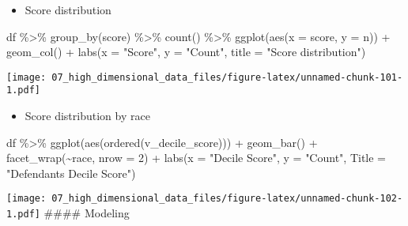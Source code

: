 \documentclass[
]{book}
\newenvironment{Shaded}{\begin{snugshade}}{\end{snugshade}}
\newcommand{\AttributeTok}[1]{\textcolor[rgb]{0.77,0.63,0.00}{#1}}
\newcommand{\DecValTok}[1]{\textcolor[rgb]{0.00,0.00,0.81}{#1}}
\newcommand{\FunctionTok}[1]{\textcolor[rgb]{0.00,0.00,0.00}{#1}}
\newcommand{\NormalTok}[1]{#1}
\newcommand{\SpecialCharTok}[1]{\textcolor[rgb]{0.00,0.00,0.00}{#1}}
\newcommand{\StringTok}[1]{\textcolor[rgb]{0.31,0.60,0.02}{#1}}
\providecommand{\tightlist}{%
  \setlength{\itemsep}{0pt}\setlength{\parskip}{0pt}}
\begin{document}
\begin{itemize}
\tightlist
\item
  Score distribution
\end{itemize}

\begin{Shaded}
\begin{Highlighting}[]
\NormalTok{df }\SpecialCharTok{\%\textgreater{}\%}
  \FunctionTok{group\_by}\NormalTok{(score) }\SpecialCharTok{\%\textgreater{}\%}
  \FunctionTok{count}\NormalTok{() }\SpecialCharTok{\%\textgreater{}\%}
  \FunctionTok{ggplot}\NormalTok{(}\FunctionTok{aes}\NormalTok{(}\AttributeTok{x =}\NormalTok{ score, }\AttributeTok{y =}\NormalTok{ n)) }\SpecialCharTok{+}
    \FunctionTok{geom\_col}\NormalTok{() }\SpecialCharTok{+}
    \FunctionTok{labs}\NormalTok{(}\AttributeTok{x =} \StringTok{"Score"}\NormalTok{,}
         \AttributeTok{y =} \StringTok{"Count"}\NormalTok{,}
         \AttributeTok{title =} \StringTok{"Score distribution"}\NormalTok{)}
\end{Highlighting}
\end{Shaded}

\texttt{[image: 07\_high\_dimensional\_data\_files/figure-latex/unnamed-chunk-101-1.pdf]}

\begin{itemize}
\tightlist
\item
  Score distribution by race
\end{itemize}

\begin{Shaded}
\begin{Highlighting}[]
\NormalTok{df }\SpecialCharTok{\%\textgreater{}\%}
  \FunctionTok{ggplot}\NormalTok{(}\FunctionTok{aes}\NormalTok{(}\FunctionTok{ordered}\NormalTok{(v\_decile\_score))) }\SpecialCharTok{+} 
          \FunctionTok{geom\_bar}\NormalTok{() }\SpecialCharTok{+}
          \FunctionTok{facet\_wrap}\NormalTok{(}\SpecialCharTok{\textasciitilde{}}\NormalTok{race, }\AttributeTok{nrow =} \DecValTok{2}\NormalTok{) }\SpecialCharTok{+}
          \FunctionTok{labs}\NormalTok{(}\AttributeTok{x =} \StringTok{"Decile Score"}\NormalTok{,}
               \AttributeTok{y =} \StringTok{"Count"}\NormalTok{,}
               \AttributeTok{Title =} \StringTok{"Defendant\textquotesingle{}s Decile Score"}\NormalTok{)}
\end{Highlighting}
\end{Shaded}

\texttt{[image: 07\_high\_dimensional\_data\_files/figure-latex/unnamed-chunk-102-1.pdf]}
\#\#\#\# Modeling
\end{document}
